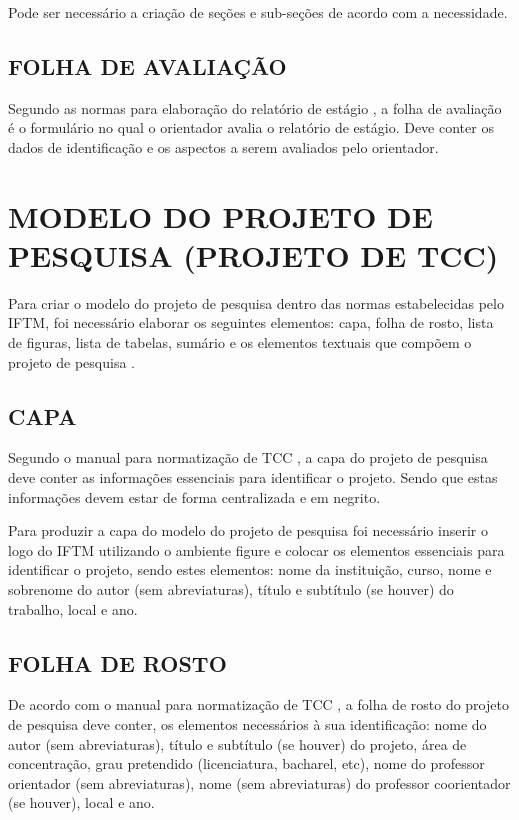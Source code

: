 Pode ser necessário a criação de seções e sub-seções de acordo com a necessidade.

\subsection{FOLHA DE AVALIAÇÃO}
Segundo as normas para elaboração do relatório de estágio \cite{manualEstagio}, a folha de avaliação é o formulário no qual o orientador avalia o relatório de estágio. Deve conter os dados de identificação e os aspectos a serem avaliados pelo orientador.

\newpage
\section{MODELO DO PROJETO DE PESQUISA (PROJETO DE TCC)}
\indent Para criar o modelo do projeto de pesquisa dentro das normas estabelecidas pelo IFTM, foi necessário elaborar os seguintes elementos: capa,  folha de rosto, lista de figuras, lista de tabelas, sumário e os elementos textuais que compõem o projeto de pesquisa \cite{manualTCC}.

\subsection{CAPA}
Segundo o manual para normatização de TCC \cite{manualTCC}, a capa do projeto de pesquisa deve conter as informações essenciais para identificar o projeto. Sendo que estas informações devem estar de forma centralizada e em negrito.

Para produzir a capa do modelo do projeto de pesquisa foi necessário inserir o logo do IFTM utilizando o ambiente figure e colocar os elementos essenciais para identificar o projeto, sendo estes elementos: nome da instituição, curso, nome e sobrenome do autor (sem abreviaturas), título e subtítulo (se houver) do trabalho, local e ano.

\subsection{FOLHA DE ROSTO}
De acordo com o manual para normatização de TCC \cite{manualTCC}, a folha de rosto do projeto de pesquisa deve conter, os elementos necessários à sua identificação: nome do autor (sem abreviaturas), título e subtítulo (se houver) do projeto, área de concentração, grau pretendido (licenciatura, bacharel, etc), nome do professor orientador (sem abreviaturas), nome (sem abreviaturas) do professor coorientador (se houver), local e ano.


